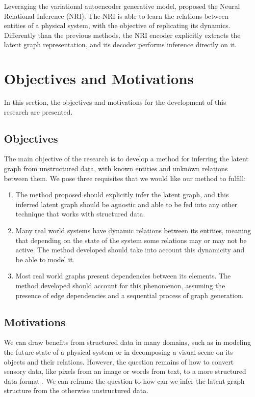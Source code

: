\documentclass[12pt,a4paper]{article}
\begin{document}
	Leveraging the variational autoencoder generative model, \textcite{KipfNRI2018} proposed the Neural Relational Inference (NRI). The NRI is able to learn the relations between entities of a physical system, with the objective of replicating its dynamics. Differently than the previous methods, the NRI encoder explicitly extracts the latent graph representation, and its decoder performs inference directly on it.
		
	\section{Objectives and Motivations}
	\label{sec:Objectives_and_motivations}
	
	In this section, the objectives and motivations for the development of this research are presented.
	
	\subsection{Objectives}
	
	The main objective of the research is to develop a method for inferring the latent graph from unstructured data, with known entities and unknown relations between them. We pose three requisites that we would like our method to fulfill:
	
	\begin{enumerate}
		\item The method proposed should explicitly infer the latent graph, and this inferred latent graph should be agnostic and able to be fed into any other technique that works with structured data.
		\item Many real world systems have dynamic relations between its entities, meaning that depending on the state of the system some relations may or may not be active. The method developed should take into account this dynamicity and be able to model it.
		\item Most real world graphs present dependencies between its elements. The method developed should account for this phenomenon, assuming the presence of edge dependencies and a sequential process of graph generation.
	\end{enumerate}

	\subsection{Motivations}
	
	We can draw benefits from structured data in many domains, such as in modeling the future state of a physical system or in decomposing a visual scene on its objects and their relations. However, the question remains of how to convert sensory data, like pixels from an image or words from text, to a more structured data format \citep{Battaglia2018}.  We can reframe the question to how can we infer the latent graph structure from the otherwise unstructured data.
	
\end{document}
